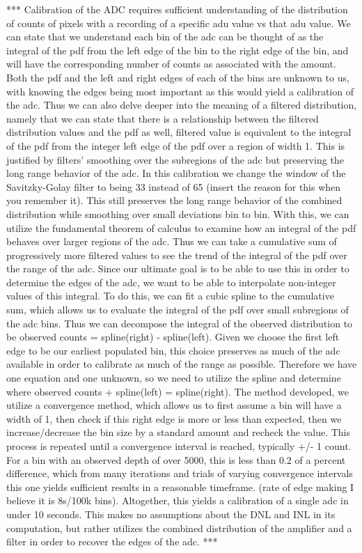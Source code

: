 \documentclass[11pt, letterpaper]{article}
\begin{document}
*** 
Calibration of the ADC requires sufficient understanding of the distribution of counts of pixels with a recording of a specific adu value vs that adu value. We can state that we understand each bin of the adc can be thought of as the integral of the pdf from the left edge of the bin to the right edge of the bin, and will have the corresponding number of counts as associated with the amount. Both the pdf and the left and right edges of each of the bins are unknown to us, with knowing the edges being most important as this would yield a calibration of the adc. Thus we can also delve deeper into the meaning of a filtered distribution, namely that we can state that there is a relationship between the filtered distribution values and the pdf as well, filtered value is equivalent to the integral of the pdf from the integer left edge of the pdf over a region of width 1. This is justified by filters’ smoothing over the subregions of the adc but preserving the long range behavior of the adc. In this calibration we change the window of the Savitzky-Golay filter to being 33 instead of 65 (insert the reason for this when you remember it). This still preserves the long range behavior of the combined distribution while smoothing over small deviations bin to bin. With this, we can utilize the fundamental theorem of calculus to examine how an integral of the pdf behaves over larger regions of the adc. Thus we can take a cumulative sum of progressively more filtered values to see the trend of the integral of the pdf over the range of the adc. Since our ultimate goal is to be able to use this in order to determine the edges of the adc, we want to be able to interpolate non-integer values of this integral. To do this, we can fit a cubic spline to the cumulative sum, which allows us to evaluate the integral of the pdf over small subregions of the adc bins. Thus we can decompose the integral of the observed distribution to be observed counts = spline(right) - spline(left). Given we choose the first left edge to be our earliest populated bin, this choice preserves as much of the adc available in order to calibrate as much of the range as possible. Therefore we have one equation and one unknown, so we need to utilize the spline and determine where observed counts + spline(left) = spline(right). 
The method developed, we utilize a convergence method, which allows us to first assume a bin will have a width of 1, then check if this right edge is more or less than expected, then we increase/decrease the bin size by a standard amount and recheck the value. This process is repeated until a convergence interval is reached, typically +/- 1 count. For a bin with an observed depth of over 5000, this is less than 0.2 of a percent difference, which from many iterations and trials of varying convergence intervals this one yields sufficient results in a reasonable timeframe. (rate of edge making I believe it is 8s/100k bins). 
Altogether, this yields a calibration of a single adc in under 10 seconds. This makes no assumptions about the DNL and INL in its computation, but rather utilizes the combined distribution of the amplifier and a filter in order to recover the edges of the adc. 
*** 
\end{document}
